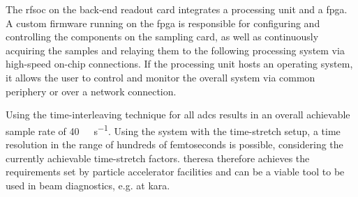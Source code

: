 The \gls{rfsoc} on the back-end readout card integrates a processing unit and a \gls{fpga}. 
A custom firmware running on the \gls{fpga} is responsible for configuring and controlling the components on the sampling card, as well as continuously acquiring the samples and relaying them to the following processing system via high-speed on-chip connections.
If the processing unit hosts an operating system, it allows the user to control and monitor the overall system via common periphery or over a network connection.

Using the time-interleaving technique for all \glspl{adc} results in an overall achievable sample rate of \SI{40}{\giga \sample \per \second}.
Using the system with the time-stretch setup, a time resolution in the range of hundreds of femtoseconds is possible, considering the currently achievable time-stretch factors.
\gls{theresa} therefore achieves the requirements set by particle accelerator facilities and can be a viable tool to be used in beam diagnostics, e.g. at \gls{kara}.
